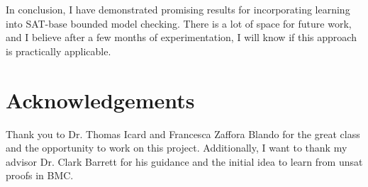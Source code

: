 \documentclass[letterpaper]{article} %
\begin{document}
In conclusion, I have demonstrated promising results for incorporating learning into SAT-base bounded model checking. There is a lot of space for future work, and I believe after a few months of experimentation, I will know if this approach is practically applicable.

\section{Acknowledgements}

Thank you to Dr. Thomas Icard and Francesca Zaffora Blando for the great class and the opportunity to work on this project. Additionally, I want to thank my advisor Dr. Clark Barrett for his guidance and the initial idea to learn from unsat proofs in BMC. 



\end{document}
